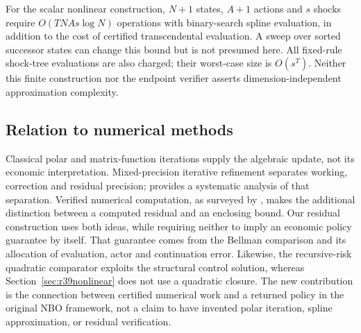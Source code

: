 For the scalar nonlinear construction, $N+1$ states, $A+1$ actions and $s$
shocks require $O(TNAs\log N)$ operations with binary-search spline evaluation,
in addition to the cost of certified transcendental evaluation. A sweep over
sorted successor states can change this bound but is not presumed here.
All fixed-rule shock-tree evaluations are also charged; their worst-case size
is $O(s^T)$. Neither this finite construction nor the endpoint verifier asserts
dimension-independent approximation complexity.

\subsection{Relation to numerical methods}
Classical polar and matrix-function iterations supply the algebraic update,
not its economic interpretation. Mixed-precision iterative refinement separates
working, correction and residual precision; \citet{CarsonHigham2018R39} provides
a systematic analysis of that separation. Verified numerical computation, as
surveyed by \citet{Rump2010R39}, makes the additional distinction between a
computed residual and an enclosing bound. Our residual construction uses both
ideas, while requiring neither to imply an economic policy guarantee by
itself. That guarantee comes from the Bellman comparison and its allocation
of evaluation, actor and continuation error. Likewise, the recursive-risk
quadratic comparator exploits the structural control solution, whereas
Section~\ref{sec:r39nonlinear} does not use a quadratic closure. The new
contribution is the connection between certified numerical work and a returned
policy in the original NBO framework, not a claim to have invented polar
iteration, spline approximation, or residual verification.

